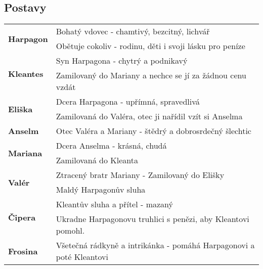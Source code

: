 \subsection*{Postavy}
\begin{tabularx}{\linewidth}{l|l}
  \multirow{2}{15em}{\textbf{Harpagon}} & Bohatý vdovec - chamtivý, bezcitný, lichvář                         \\
                                        & Obětuje cokoliv - rodinu, děti i svoji lásku pro peníze             \\
  \hline
  \multirow{2}{15em}{\textbf{Kleantes}} & Syn Harpagona - chytrý a podnikavý                                  \\
                                        & Zamilovaný do Mariany a nechce se jí za žádnou cenu vzdát           \\
  \hline
  \multirow{2}{15em}{\textbf{Eliška}}   & Dcera Harpagona - upřímná, spravedlivá                              \\
                                        & Zamilovaná do Valéra, otec ji nařídil vzít si Anselma               \\
  \hline
  \textbf{Anselm}                       & Otec Valéra a Mariany - štědrý a dobrosrdečný šlechtic              \\
  \hline
  \multirow{2}{15em}{\textbf{Mariana}}  & Dcera Anselma - krásná, chudá                                       \\
                                        & Zamilovaná do Kleanta                                               \\
  \hline
  \multirow{2}{15em}{\textbf{Valér}}    & Ztracený bratr Mariany - Zamilovaný do Elišky                       \\
                                        & Maldý Harpagonův sluha                                              \\
  \hline
  \multirow{2}{15em}{\textbf{Čipera}}   & Kleantův sluha a přítel - mazaný                                    \\
                                        & Ukradne Harpagonovu truhlici s penězi, aby Kleantovi pomohl.        \\
  \hline
  \textbf{Frosina}                      & Všetečná rádkyně a intrikánka - pomáhá Harpagonovi a poté Kleantovi \\
\end{tabularx}
